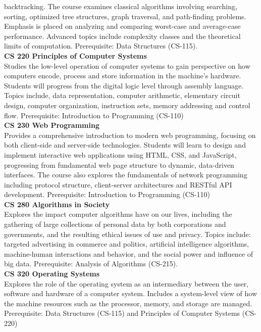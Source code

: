 \documentclass[
  letterpaper,
]{scrbook}
\begin{document}
backtracking. The course examines classical algorithms involving
searching, sorting, optimized tree structures, graph traversal, and
path-finding problems. Emphasis is placed on analyzing and comparing
worst-case and average-case performance. Advanced topics include
complexity classes and the theoretical limits of computation.
Prerequisite: Data Structures (CS-115).\\
\textbf{CS 220 Principles of Computer Systems}\\
Studies the low-level operation of computer systems to gain perspective
on how computers encode, process and store information in the machine's
hardware. Students will progress from the digital logic level through
assembly language. Topics include, data representation, computer
arithmetic, elementary circuit design, computer organization,
instruction sets, memory addressing and control flow. Prerequisite:
Introduction to Programming (CS-110)\\
\textbf{CS 230 Web Programming}\\
Provides a comprehensive introduction to modern web programming,
focusing on both client-side and server-side technologies. Students will
learn to design and implement interactive web applications using HTML,
CSS, and JavaScript, progressing from fundamental web page structure to
dynamic, data-driven interfaces. The course also explores the
fundamentals of network programming including protocol structure,
client-server architectures and RESTful API development. Prerequisite:
Introduction to Programming (CS-110)\\
\textbf{CS 280 Algorithms in Society}\\
Explores the impact computer algorithms have on our lives, including the
gathering of large collections of personal data by both corporations and
governments, and the resulting ethical issues of use and privacy. Topics
include: targeted advertising in commerce and politics, artificial
intelligence algorithms, machine-human interactions and behavior, and
the social power and influence of big data. Prerequisite: Analysis of
Algorithms (CS-215).\\
\textbf{CS 320 Operating Systems}\\
Explores the role of the operating system as an intermediary between the
user, software and hardware of a computer system. Includes a
system-level view of how the machine resources such as the processor,
memory, and storage are managed. Prerequisite: Data Structures (CS-115)
and Principles of Computer Systems (CS-220)\\
\end{document}
